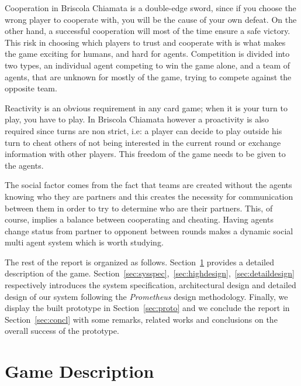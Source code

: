 \documentclass[a4paper]{article}
\begin{document}
Cooperation in Briscola Chiamata is a double-edge sword, since if you choose the wrong player to cooperate with, you will be the cause of your own defeat. On the other hand, a successful cooperation will most of the time ensure a safe victory. This risk in choosing which players to trust and cooperate with is what makes the game exciting for humans, and hard for agents. Competition is divided into two types, an individual agent competing to win the game alone, and a team of agents, that are unknown for mostly of the game, trying to compete against the opposite team.

Reactivity is an obvious requirement in any card game; when it is your turn to play, you have to play. In Briscola Chiamata however a proactivity is also required since turns are non strict, i.e: a player can decide to play outside his turn to cheat others of not being interested in the current round or exchange information with other players. This freedom of the game needs to be given to the agents.

The social factor comes from the fact that teams are created without the agents knowing who they are partners and this creates the necessity for communication between them in order to try to determine who are their partners. This, of course, implies a balance between cooperating and cheating. Having agents change status from partner to opponent between rounds makes a dynamic social multi agent system which is worth studying.

The rest of the report is organized as follows. Section~\ref{sec:gamedescr} provides a detailed description of the game. Section~\ref{sec:sysspec},~\ref{sec:highdesign},~\ref{sec:detaildesign} respectively introduces the system specification, architectural design and detailed design of our system following the \emph{Prometheus} design methodology. Finally, we display the built prototype in Section~\ref{sec:proto} and we conclude the report in Section~\ref{sec:concl} with some remarks, related works and conclusions on the overall success of the prototype.

\section{Game Description}\label{sec:gamedescr}
\end{document}
